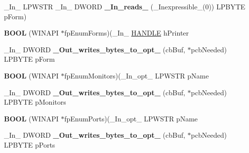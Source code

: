 \begin{DoxyCompactItemize}
\item 
\mbox{\label{struct___p_r_i_n_t_p_r_o_v_i_d_o_r_a982ff6bfca005dd4ca1d08b857e55be5}} 
\+\_\+\+In\+\_\+ L\+P\+W\+S\+TR \+\_\+\+In\+\_\+ D\+W\+O\+RD {\bfseries \+\_\+\+In\+\_\+reads\+\_\+} (\+\_\+\+Inexpressible\+\_\+(0)) L\+P\+B\+Y\+TE p\+Form)
\item 
\mbox{\label{struct___p_r_i_n_t_p_r_o_v_i_d_o_r_ad881e3b37310bcd5985b67289ce31a64}} 
{\bfseries B\+O\+OL} (W\+I\+N\+A\+PI $\ast$fp\+Enum\+Forms)(\+\_\+\+In\+\_\+ \hyperlink{interfacevoid}{H\+A\+N\+D\+LE} h\+Printer
\item 
\mbox{\label{struct___p_r_i_n_t_p_r_o_v_i_d_o_r_ad345f5b7d4ac1997e981dbb4129f10e4}} 
\+\_\+\+In\+\_\+ D\+W\+O\+RD {\bfseries \+\_\+\+Out\+\_\+writes\+\_\+bytes\+\_\+to\+\_\+opt\+\_\+} (cb\+Buf, $\ast$pcb\+Needed) L\+P\+B\+Y\+TE p\+Form
\item 
\mbox{\label{struct___p_r_i_n_t_p_r_o_v_i_d_o_r_a40f161a048d123ffc166004fa7ec9c3b}} 
{\bfseries B\+O\+OL} (W\+I\+N\+A\+PI $\ast$fp\+Enum\+Monitors)(\+\_\+\+In\+\_\+opt\+\_\+ L\+P\+W\+S\+TR p\+Name
\item 
\mbox{\label{struct___p_r_i_n_t_p_r_o_v_i_d_o_r_a2019a10baf879eae82289dfbf8a29771}} 
\+\_\+\+In\+\_\+ D\+W\+O\+RD {\bfseries \+\_\+\+Out\+\_\+writes\+\_\+bytes\+\_\+to\+\_\+opt\+\_\+} (cb\+Buf, $\ast$pcb\+Needed) L\+P\+B\+Y\+TE p\+Monitors
\item 
\mbox{\label{struct___p_r_i_n_t_p_r_o_v_i_d_o_r_a828eca9dd117ce637a93893ec42aa167}} 
{\bfseries B\+O\+OL} (W\+I\+N\+A\+PI $\ast$fp\+Enum\+Ports)(\+\_\+\+In\+\_\+opt\+\_\+ L\+P\+W\+S\+TR p\+Name
\item 
\mbox{\label{struct___p_r_i_n_t_p_r_o_v_i_d_o_r_a84fd3f4497daf5668dee4d0c91fa7424}} 
\+\_\+\+In\+\_\+ D\+W\+O\+RD {\bfseries \+\_\+\+Out\+\_\+writes\+\_\+bytes\+\_\+to\+\_\+opt\+\_\+} (cb\+Buf, $\ast$pcb\+Needed) L\+P\+B\+Y\+TE p\+Ports
\item 
\mbox{\label{struct___p_r_i_n_t_p_r_o_v_i_d_o_r_a660de7ac8f21dc40b8b1fa2547520739}} 

\end{DoxyCompactItemize}

